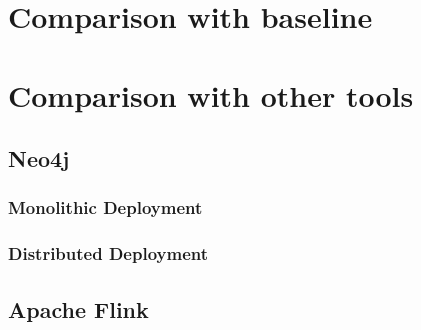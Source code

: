 \section{Comparison with baseline}\label{sec:cmpBaseline}
\section{Comparison with other tools}\label{sec:cmpOtherTools}
\subsection{Neo4j}
\subsubsection{Monolithic Deployment}
\subsubsection{Distributed Deployment}
\subsection{Apache Flink}

